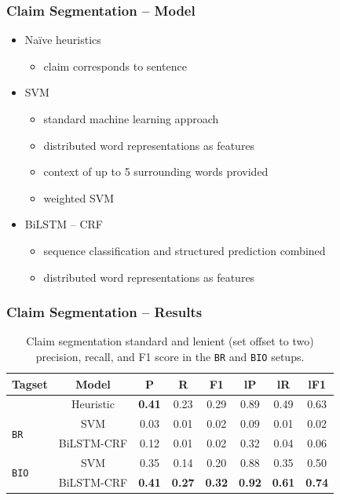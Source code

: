 \documentclass{beamer}
\begin{document}
\begin{frame}
	\frametitle{Claim Segmentation -- Model}

	\begin{itemize}
		\item Na\"ive heuristics
		\begin{itemize}
			\item claim corresponds to sentence
		\end{itemize}
		\item SVM
		\begin{itemize}
			\item standard machine learning approach
			\item distributed word representations as features
			\item context of up to 5 surrounding words provided 
			\item weighted SVM
		\end{itemize}
		\item BiLSTM -- CRF
		\begin{itemize}
			\item sequence classification and structured prediction combined
			\item distributed word representations as features
		\end{itemize}
	\end{itemize}
\end{frame}

\begin{frame}

\frametitle{Claim Segmentation -- Results}

\begin{table}
\setlength{\tabcolsep}{6pt} %
\renewcommand{\arraystretch}{1.2} %
	\begin{tabular}{l c  c c c c c c}
\toprule
		Tagset & Model & P & R & F1 & lP & lR & lF1 \\
      \midrule
		& Heuristic    & \textbf{0.41} & 0.23 & 0.29 & 0.89 & 0.49 & 0.63 \\
		\cline{2-8}
		\multirow{2}{*}{\texttt{BR} } & SVM & 0.03 & 0.01 & 0.02 & 0.09 & 0.01 & 0.02 \\
		                     & BiLSTM-CRF & 0.12 & 0.01 & 0.02 & 0.32 & 0.04 & 0.06 \\
		\cline{2-8}
		\multirow{2}{*}{\texttt{BIO}} & SVM & 0.35 & 0.14 & 0.20 & 0.88 & 0.35 & 0.50 \\
				     & BiLSTM-CRF & 
				     \textbf{0.41} & 
				     \textbf{0.27}  & \textbf{0.32} & \textbf{0.92} & \textbf{0.61} & \textbf{0.74} \\
      \bottomrule
	\end{tabular}
	\caption{Claim segmentation standard and lenient (set offset to two) precision, recall, 
	and F1 score in the \texttt{BR} and \texttt{BIO} setups. }
\end{table}
\end{frame}
\end{document}
